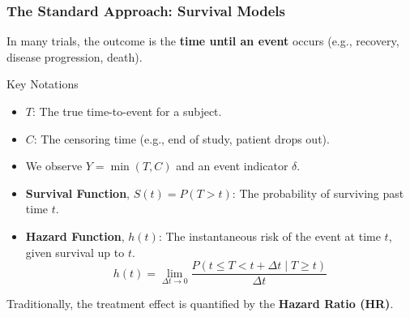 \documentclass{beamer}
\begin{document}
\begin{frame}
\frametitle{The Standard Approach: Survival Models}
In many trials, the outcome is the \textbf{time until an event} occurs (e.g., recovery, disease progression, death).

\begin{block}{Key Notations}
\begin{itemize}
    \item $T$: The true time-to-event for a subject.
    \item $C$: The censoring time (e.g., end of study, patient drops out).
    \item We observe $Y = \min(T, C)$ and an event indicator $\delta$.
    \item \textbf{Survival Function}, $S(t) = P(T > t)$: The probability of surviving past time $t$.
    \item \textbf{Hazard Function}, $h(t)$: The instantaneous risk of the event at time $t$, given survival up to $t$.
    $$h(t) = \lim_{\Delta t \to 0} \frac{P(t \le T < t + \Delta t \mid T \ge t)}{\Delta t}$$
\end{itemize}
\end{block}
Traditionally, the treatment effect is quantified by the \textbf{Hazard Ratio (HR)}.
\end{frame}
\end{document}

